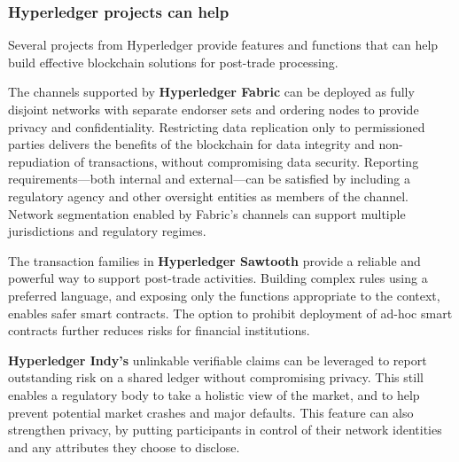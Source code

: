\subsubsection{Hyperledger projects can help}

Several projects from Hyperledger provide features and functions that can help build effective  blockchain solutions for post-trade processing. 

The channels supported by \textbf{Hyperledger Fabric} can be deployed as fully disjoint networks with separate endorser sets and ordering nodes to provide privacy and confidentiality. Restricting data replication only to permissioned parties delivers the benefits of the blockchain for data integrity and non-repudiation of transactions, without compromising data security. Reporting requirements---both internal and external---can be satisfied by including a regulatory agency and other oversight entities as members of the channel. Network segmentation enabled by Fabric's channels can support multiple jurisdictions and regulatory regimes.

The transaction families in \textbf{Hyperledger Sawtooth} provide a reliable and powerful way to support post-trade activities. Building complex rules using a preferred language, and exposing only the functions appropriate to the context, enables safer smart contracts. The option to prohibit  deployment of ad-hoc smart contracts further reduces risks for financial institutions.

\textbf{Hyperledger Indy's} unlinkable verifiable claims can be leveraged to report outstanding risk on a shared ledger without compromising privacy. This still enables a regulatory body to take a holistic view of the market, and to help prevent potential market crashes and major defaults. This feature can also strengthen privacy, by putting participants in control of their network identities and any attributes they choose to disclose.